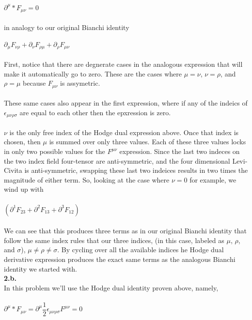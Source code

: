\documentclass[prb,preprint]
{revtex4-1}
\newcommand{\PRLsep}{\noindent\makebox[\linewidth]{\resizebox{0.8888\linewidth}{2pt}{$\bullet$}}\bigskip}
\begin{document}
\\
\\
$\partial^\mu *F_{\mu\nu} = 0$
\\
\\
in analogy to our original Bianchi identity
\\
\\
$\partial_\mu F_{\nu\rho} + \partial_\nu F_{\rho\mu} + \partial_\rho F_{\mu\nu}$
\\
\\
First, notice that there are degnerate cases in the analogous expression that will make it automatically go to zero.  These are the cases where $\mu = \nu$, $\nu = \rho$, and $\rho = \mu$ because $F_{\mu\nu}$ is assymetric.
\\
\\
These same cases also appear in the first expression, where if any of the indeics of $\epsilon_{\mu\nu\rho\sigma}$ are equal to each other then the epxression is zero.
\\
\\
$\nu$ is the only free index of the Hodge dual expression above.  Once that index is chosen, then $\mu$ is summed over only three values.  Each of these three values locks in only two possible values for the $F^{\mu\nu}$ expression.  Since the last two indeces on the two index field four-tensor are anti-symmetric, and the four dimensional Levi-Civita is anti-symmetric, swapping these last two indeices results in two times the magnitude of either term.  So, looking at the case where $\nu = 0$ for example, we wind up with 
\\
\\
$\left(\partial^1 F_{23} + \partial^2 F_{13} +\partial^3 F_{12}\right)$
\\
\\
We can see that this produces three terms as in our original Bianchi identity that follow the same index rules that our three indices, (in this case, labeled as $\mu$, $\rho$, and $\sigma$), $\mu \neq \rho \neq \sigma$.  By cycling over all the available indices he Hodge dual derivative expression produces the exact same terms as the analogous Bianchi identity we started with.
\\
\PRLsep
\newpage
\textbf{2.b.}
\\
In this problem we'll use the Hodge dual identity proven above, namely, 
\\
\\
$\partial^\mu *F_{\mu\nu} = \partial^\mu \dfrac{1}{2}\epsilon_{\mu\nu\rho\sigma}F^{\mu\nu} = 0$
\\
\end{document}
